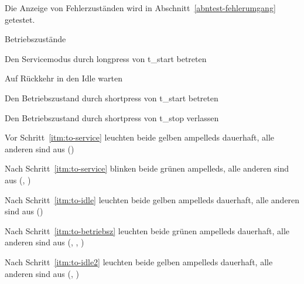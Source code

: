 \label{abntest-zustandsanzeigen}
\begin{anmerkungen}
    \item Die Anzeige von Fehlerzuständen wird in Abschnitt~\ref{abntest-fehlerumgang} getestet.
\end{anmerkungen}

\begin{ablauf}{Betriebszustände}
    \item \label{itm:to-service} Den Servicemodus durch \gls{longpress} von \gls{t_start} betreten
    \item \label{itm:to-idle} Auf Rückkehr in den Idle warten
    \item \label{itm:to-betriebsz} Den Betriebszustand durch \gls{shortpress} von \gls{t_start} betreten
    \item \label{itm:to-idle2} Den Betriebszustand durch \gls{shortpress} von \gls{t_stop} verlassen
\end{ablauf}
\begin{erwartung}
    \item Vor Schritt~\ref{itm:to-service} leuchten
    beide gelben \glspl{ampelled} dauerhaft, alle anderen sind aus ()
    \item Nach Schritt~\ref{itm:to-service} blinken
    beide grünen \glspl{ampelled}, alle anderen sind aus (, )
    \item Nach Schritt~\ref{itm:to-idle} leuchten
    beide gelben \glspl{ampelled} dauerhaft, alle anderen sind aus ()
    \item Nach Schritt~\ref{itm:to-betriebsz} leuchten
    beide grünen \glspl{ampelled} dauerhaft, alle anderen sind aus (, , )
    \item Nach Schritt~\ref{itm:to-idle2} leuchten
    beide gelben \glspl{ampelled} dauerhaft, alle anderen sind aus (, )
\end{erwartung}
